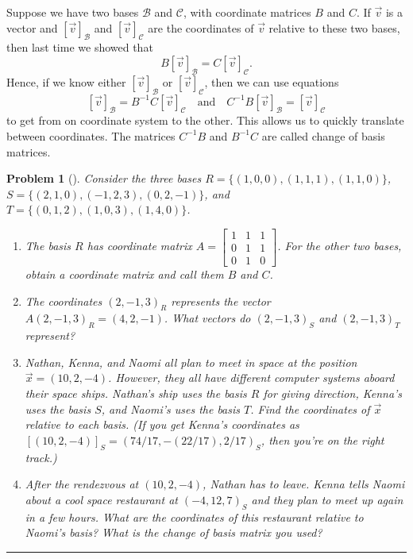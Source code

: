 \documentclass[letterpaper,oneside]{book}%
\theoremstyle{plain}
\theoremstyle{box}
\theoremstyle{problem}
\newtheorem{problemnum}{Problem}[chapter]
\newenvironment{problem}[1][]{\begin{problemnum}[#1]}{\end{problemnum}\nopagebreak\hrule\bigskip}
\newcommand{\bvec}[1]{\begin{bmatrix} #1 \end{bmatrix}}
\begin{document}
Suppose we have two bases $\mathscr{B}$ and $\mathscr{C}$, with coordinate matrices $B$ and $C$.  If $\vec v$ is a vector and $[\vec v]_\mathscr{B}$ and $[\vec v]_\mathscr{C}$ are the coordinates of $\vec v$ relative to these two bases, then last time we showed that 
$$B[\vec v]_\mathscr{B} = C[\vec v]_\mathscr{C}. $$  
Hence, if we know either 
$[\vec v]_\mathscr{B}$ or $[\vec v]_\mathscr{C}$, then we can use equations 
$$[\vec v]_\mathscr{B} = B^{-1}C[\vec v]_\mathscr{C}
\quad\text{and}\quad 
C^{-1}B[\vec v]_\mathscr{B} = [\vec v]_\mathscr{C}
$$  
to get from on coordinate system to the other. This allows us to quickly translate between coordinates.  The matrices $C^{-1}B$ and $B^{-1}C$ are called change of basis matrices.  
\begin{problem}
 Consider the three bases $R = \{(1,0,0), (1,1,1) , (1,1,0)\}$, $S=\{(2,1,0),(-1,2,3),(0,2,-1)\}$, and $T = \{(0,1,2),(1,0,3),(1,4,0)\}$. 
 \begin{enumerate}
  \item The basis $R$ has coordinate matrix $A = \bvec{1&1&1\\0&1&1\\0&1&0}$.  For the other two bases, obtain a coordinate matrix and call them $B$ and $C$. 
  \item The coordinates $(2,-1,3)_R$ represents the vector $A(2,-1,3)_R = (4,2,-1)$. What vectors do $(2,-1,3)_S$ and $(2,-1,3)_T$ represent? 
  \item Nathan, Kenna, and Naomi all plan to meet in space at the position $\vec x = (10,2,-4)$.  However, they all have different computer systems aboard their space ships.  Nathan's ship uses the basis $R$ for giving direction, Kenna's uses the basis $S$, and Naomi's uses the basis $T$.  Find the coordinates of $\vec x$ relative to each basis. (If you get Kenna's coordinates as $[(10,2,-4)]_S=(74/17, -(22/17), 2/17)_S$, then you're on the right track.)
  \item After the rendezvous at $(10,2,-4)$, Nathan has to leave.  Kenna tells Naomi about a cool space restaurant at $(-4,12,7)_S$ and they plan to meet up again in a few hours.  What are the coordinates of this restaurant relative to Naomi's basis? What is the change of basis matrix you used?
 \end{enumerate}
\end{problem}
\end{document}
